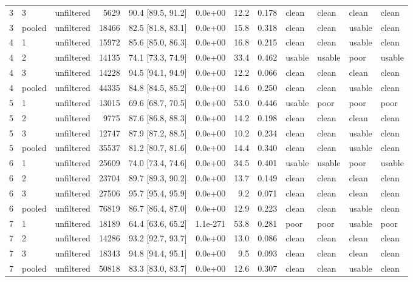 \begin{longtable}{lllrrrrrllll}
3 & 3 & unfiltered & 5629 & 90.4 [89.5, 91.2] & 0.0e+00 & 12.2 & 0.178 & clean & clean & clean & clean \\
3 & pooled & unfiltered & 18466 & 82.5 [81.8, 83.1] & 0.0e+00 & 15.8 & 0.318 & clean & clean & usable & clean \\
4 & 1 & unfiltered & 15972 & 85.6 [85.0, 86.3] & 0.0e+00 & 16.8 & 0.215 & clean & clean & usable & clean \\
4 & 2 & unfiltered & 14135 & 74.1 [73.3, 74.9] & 0.0e+00 & 33.4 & 0.462 & usable & usable & poor & usable \\
4 & 3 & unfiltered & 14228 & 94.5 [94.1, 94.9] & 0.0e+00 & 12.2 & 0.066 & clean & clean & clean & clean \\
4 & pooled & unfiltered & 44335 & 84.8 [84.5, 85.2] & 0.0e+00 & 14.6 & 0.250 & clean & clean & usable & clean \\
5 & 1 & unfiltered & 13015 & 69.6 [68.7, 70.5] & 0.0e+00 & 53.0 & 0.446 & usable & poor & poor & poor \\
5 & 2 & unfiltered & 9775 & 87.6 [86.8, 88.3] & 0.0e+00 & 14.2 & 0.198 & clean & clean & clean & clean \\
5 & 3 & unfiltered & 12747 & 87.9 [87.2, 88.5] & 0.0e+00 & 10.2 & 0.234 & clean & clean & usable & clean \\
5 & pooled & unfiltered & 35537 & 81.2 [80.7, 81.6] & 0.0e+00 & 14.4 & 0.340 & clean & clean & usable & clean \\
6 & 1 & unfiltered & 25609 & 74.0 [73.4, 74.6] & 0.0e+00 & 34.5 & 0.401 & usable & usable & poor & usable \\
6 & 2 & unfiltered & 23704 & 89.7 [89.3, 90.2] & 0.0e+00 & 13.7 & 0.149 & clean & clean & clean & clean \\
6 & 3 & unfiltered & 27506 & 95.7 [95.4, 95.9] & 0.0e+00 & 9.2 & 0.071 & clean & clean & clean & clean \\
6 & pooled & unfiltered & 76819 & 86.7 [86.4, 87.0] & 0.0e+00 & 12.9 & 0.223 & clean & clean & usable & clean \\
7 & 1 & unfiltered & 18189 & 64.4 [63.6, 65.2] & 1.1e-271 & 53.8 & 0.281 & poor & poor & usable & poor \\
7 & 2 & unfiltered & 14286 & 93.2 [92.7, 93.7] & 0.0e+00 & 13.0 & 0.086 & clean & clean & clean & clean \\
7 & 3 & unfiltered & 18343 & 94.8 [94.4, 95.1] & 0.0e+00 & 9.5 & 0.093 & clean & clean & clean & clean \\
7 & pooled & unfiltered & 50818 & 83.3 [83.0, 83.7] & 0.0e+00 & 12.6 & 0.307 & clean & clean & usable & clean \\

\end{longtable}

